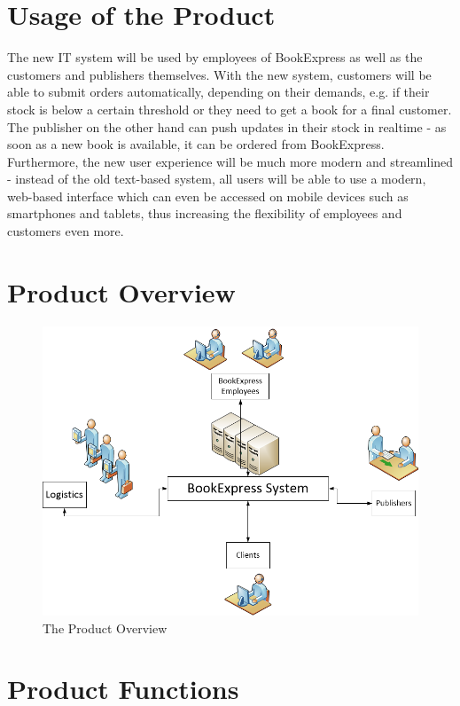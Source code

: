 \documentclass[11pt,a4paper,oneside,svgnames]{report}
\begin{document}
\chapter{Usage of the Product}
The new IT system will be used by employees of BookExpress as well as the customers and publishers themselves. With the new system, customers will be able to submit orders automatically, depending on their demands, e.g. if their stock is below a certain threshold or they need to get a book for a final customer. The publisher on the other hand can push updates in their stock in realtime - as soon as a new book is available, it can be ordered from BookExpress. Furthermore, the new user experience will be much more modern and streamlined - instead of the old text-based system, all users will be able to use a modern, web-based interface which can even be accessed on mobile devices such as smartphones and tablets, thus increasing the flexibility of employees and customers even more.
\\
\clearpage
\chapter{Product Overview}

\begin{figure}[H]
 \begin{center}
  \includegraphics[width=\textwidth]{ProductOverview.png}
 \end{center}
 \caption{The Product Overview}
\end{figure}

\chapter{Product Functions}
\end{document}
